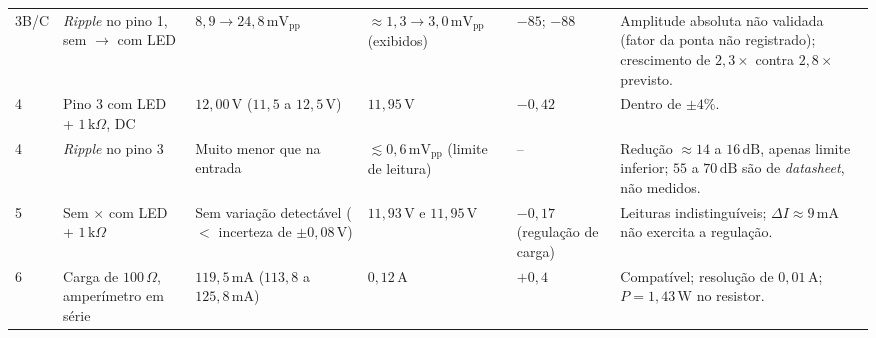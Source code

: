 \begin{table}[t]
\begin{tabular}{lp{2.4cm}p{3.1cm}p{3.3cm}p{1.5cm}p{4.9cm}}
3B/C & \textit{Ripple} no pino 1, sem $\to$ com LED & $8{,}9 \to 24{,}8\,\text{mV}_{\text{pp}}$ & $\approx 1{,}3 \to 3{,}0\,\text{mV}_{\text{pp}}$ (exibidos) & $-85$; $-88$ & Amplitude absoluta não validada (fator da ponta não registrado); crescimento de $2{,}3\times$ contra $2{,}8\times$ previsto. \\
4 & Pino 3 com LED + $1\,\text{k}\Omega$, DC & $12{,}00\,\text{V}$ ($11{,}5$ a $12{,}5\,\text{V}$) & $11{,}95\,\text{V}$ & $-0{,}42$ & Dentro de $\pm 4\%$. \\
4 & \textit{Ripple} no pino 3 & Muito menor que na entrada & $\lesssim 0{,}6\,\text{mV}_{\text{pp}}$ (limite de leitura) & -- & Redução $\approx 14$ a $16\,\text{dB}$, apenas limite inferior; $55$ a $70\,\text{dB}$ são de \textit{datasheet}, não medidos. \\
5 & Sem $\times$ com LED + $1\,\text{k}\Omega$ & Sem variação detectável ($<$ incerteza de $\pm 0{,}08\,\text{V}$) & $11{,}93\,\text{V}$ e $11{,}95\,\text{V}$ & $-0{,}17$ (regulação de carga) & Leituras indistinguíveis; $\Delta I \approx 9\,\text{mA}$ não exercita a regulação. \\
6 & Carga de $100\,\Omega$, amperímetro em série & $119{,}5\,\text{mA}$ ($113{,}8$ a $125{,}8\,\text{mA}$) & $0{,}12\,\text{A}$ & $+0{,}4$ & Compatível; resolução de $0{,}01\,\text{A}$; $P = 1{,}43\,\text{W}$ no resistor. \\
\hline
\end{tabular}
\end{table}

